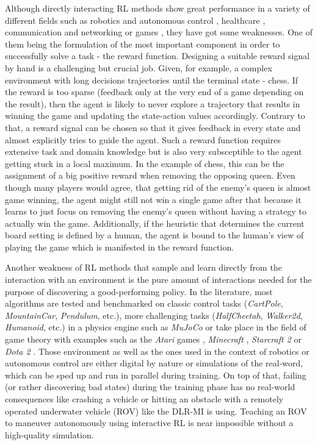 Although directly interacting RL methods show great performance in a variety of different fields such as robotics and autonomous control \cite[]{etemad2020using, patil2021deep, wang2018reinforcement}, healthcare \cite[]{tseng2017deep, yu2019incorporating},  communication and networking \cite[]{chinchali2018cellular, fadlullah2017state}  or games \cite[]{berner2019dota, mnih2013playing, wu2016training}, they have got some weaknesses. One of them being the formulation of the most important component in order to successfully solve a task - the reward function. Designing a suitable reward signal by hand is a challenging but crucial job. Given, for example, a complex environment with long decisions trajectories until the terminal state - chess. If the reward is too sparse (feedback only at the very end of a game depending on the result), then the agent is likely to never explore a trajectory that results in winning the game and updating the state-action values accordingly. Contrary to that, a reward signal can be chosen so that it gives feedback in every state and almost explicitly tries to guide the agent. Such a reward function requires extensive task and domain knowledge but is also very subsceptible to the agent getting stuck in a local maximum. In the example of chess, this can be the assignment of a big positive reward when removing the opposing queen. Even though many players would agree, that getting rid of the enemy's queen is almost game winning, the agent might still not win a single game after that because it learns to just focus on removing the enemy's queen without having a strategy to actually win the game. Additionally, if the heuristic that determines the current board setting is defined by a human, the agent is bound to the human's view of playing the game which is manifested in the reward function. 
\par
Another weakness of RL methods that sample and learn directly from the interaction with an environment is the pure amount of interactions needed for the purpose of discovering a good-performing policy. In the literature, most algorithms are tested and benchmarked on classic control tasks (\textit{CartPole}, \textit{MountainCar}, \textit{Pendulum}, etc.), more challenging tasks (\textit{HalfCheetah}, \textit{Walker2d}, \textit{Humanoid}, etc.) in a physics engine such as \textit{MuJoCo} \cite[]{todorov2012mujoco} or take place in the field of game theory with examples such as the \textit{Atari} games \cite[]{mnih2013playing}, \textit{Minecraft} \cite[]{johnson2016malmo}, \textit{Starcraft 2} \cite[]{vinyals2019grandmaster} or \textit{Dota 2} \cite[]{berner2019dota}. Those environment as well as the ones used in the context of robotics or autonomous control are either digital by nature or simulations of the real-word, which can be sped up and run in parallel during training. On top of that, failing (or rather discovering bad states) during the training phase has no real-world consequences like crashing a vehicle or hitting an obstacle with a remotely operated underwater vehicle (ROV) like the DLR-MI is using. Teaching an ROV to maneuver autonomously using interactive RL is near impossible without a high-quality simulation.
